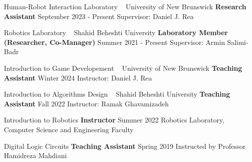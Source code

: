 \begin{cventries}

    \cventry
    {Human-Robot Interaction Laboratory ~ University of New Brunswick}
    {\bullet \space \textbf {Research Assistant}}
    {}
    {September 2023 - Present}
    {Supervisor: Daniel J. Rea}
    \vspace{0.4 cm}

    \cventry
    {Robotics Laboratory ~ Shahid Beheshti University}
    {\bullet \space \textbf {Laboratory Member (Researcher, Co-Manager)}}
    {}
    {Summer 2021 - Present}
    {Supervisor: Armin Salimi-Badr}
    \vspace{0.4 cm}

    \cventry
    {Introduction to Game Developement ~ University of New Brunswick}
    {\bullet \space \textbf {Teaching Assistant}}
    {}
    {Winter 2024}
    {Instructor: Daniel J. Rea}
    \vspace{0.4 cm}

    \cventry
    {Introduction to Algorithms Design ~ Shahid Beheshti University}
    {\bullet \space \textbf {Teaching Assistant}}
    {}
    {Fall 2022}
    {Instructor: Ramak Ghavamizadeh}
    \vspace{0.4 cm}
    
    \cventry
    {Introduction to Robotics}
    {\bullet \space \textbf {Instructor}}
    {}
    {Summer 2022}
    {Robotics Laboratory, Computer Science and Engineering Faculty}
    \vspace{0.4 cm}
    
    \cventry
    {Digital Logic Circuits}
    {\bullet \space \textbf {Teaching Assistant}}
    {}
    {Spring 2019}
    {Instructed by Professor Hamidreza Mahdiani}
    
\end{cventries}